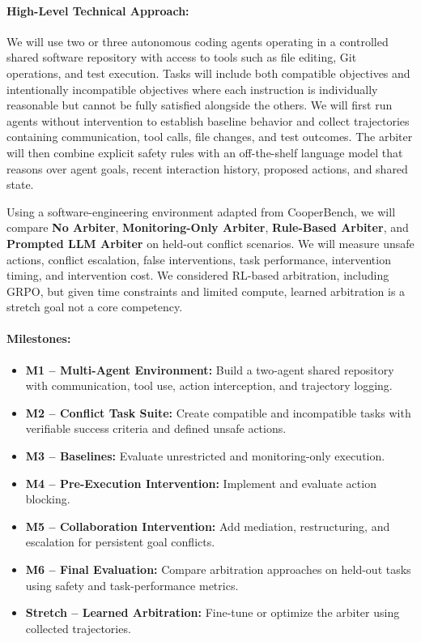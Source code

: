 \documentclass[11pt]{article}
\begin{document}
\paragraph{High-Level Technical Approach:}
We will use two or three autonomous coding agents operating in a controlled shared software repository with access to tools such as file editing, Git operations, and test execution. Tasks will include both compatible objectives and intentionally incompatible objectives where each instruction is individually reasonable but cannot be fully satisfied alongside the others. We will first run agents without intervention to establish baseline behavior and collect trajectories containing communication, tool calls, file changes, and test outcomes. The arbiter will then combine explicit safety rules with an off-the-shelf language model that reasons over agent goals, recent interaction history, proposed actions, and shared state.

Using a software-engineering environment adapted from CooperBench, we will compare \textbf{No Arbiter}, \textbf{Monitoring-Only Arbiter}, \textbf{Rule-Based Arbiter}, and \textbf{Prompted LLM Arbiter} on held-out conflict scenarios. We will measure unsafe actions, conflict escalation, false interventions, task performance, intervention timing, and intervention cost. We considered RL-based arbitration, including GRPO, but given time constraints and limited compute, learned arbitration is a stretch goal not a core competency.

\vspace{-0.5em}

\paragraph{Milestones:}
\begin{itemize}[leftmargin=1.4em,itemsep=0pt,topsep=2pt,parsep=0pt,partopsep=0pt]
    \item \textbf{M1 -- Multi-Agent Environment:} Build a two-agent shared repository with communication, tool use, action interception, and trajectory logging.
    \item \textbf{M2 -- Conflict Task Suite:} Create compatible and incompatible tasks with verifiable success criteria and defined unsafe actions.
    \item \textbf{M3 -- Baselines:} Evaluate unrestricted and monitoring-only execution.
    \item \textbf{M4 -- Pre-Execution Intervention:} Implement and evaluate action blocking.
    \item \textbf{M5 -- Collaboration Intervention:} Add mediation, restructuring, and escalation for persistent goal conflicts.
    \item \textbf{M6 -- Final Evaluation:} Compare arbitration approaches on held-out tasks using safety and task-performance metrics.
    \item \textbf{Stretch -- Learned Arbitration:} Fine-tune or optimize the arbiter using collected trajectories.
\end{itemize}
\end{document}
